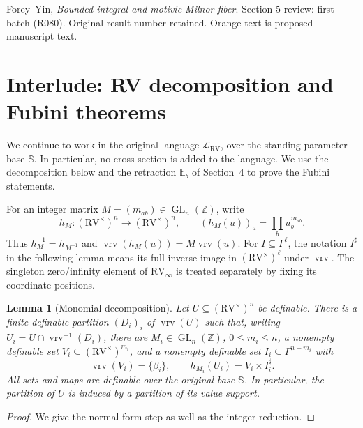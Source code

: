 \documentclass[12pt]{amsart}
\newtheorem{lem}{Lemma}[section]
\newcommand{\RV}{\mathrm{RV}}
\newcommand{\Z}{\mathds{Z}}
\newcommand{\vrv}{\operatorname{vrv}}
\newcommand{\GL}{\operatorname{GL}}
\newcommand{\Sbase}{\mathbb S}
\newcommand{\RVlang}{\mathcal L_{\mathrm{RV}}}
\numberwithin{equation}{section}
\begin{document}
\setcounter{section}{4}
{\small\noindent Forey--Yin, \emph{Bounded integral and motivic Milnor fiber}.
Section 5 review: first batch (R080). Original result number retained.
Orange text is proposed manuscript text.}
\medskip

{\color{ProposalOrange}
\section{Interlude: RV decomposition and Fubini theorems}\label{csndag}

We continue to work in the original language $\RVlang$, over the
standing parameter base $\Sbase$. In particular, no cross-section is
added to the language. We use the decomposition below and the
retraction $\mathbb E_b$ of Section~4 to prove the Fubini statements.

For an integer matrix $M=(m_{ab})\in\GL_n(\Z)$, write
\[
 h_M:(\RV^\times)^n\longrightarrow(\RV^\times)^n,\qquad
 (h_M(u))_a=\prod_b u_b^{m_{ab}}.
\]
Thus $h_M^{-1}=h_{M^{-1}}$ and
$\vrv(h_M(u))=M\vrv(u)$. For $I\subseteq\Gamma^\ell$, the notation
$I^\sharp$ in the following lemma means its full inverse image in
$(\RV^\times)^\ell$ under $\vrv$. The singleton zero/infinity element
of $\RV_\infty$ is treated separately by fixing its coordinate positions.

\setcounter{lem}{11}
\begin{lem}[Monomial decomposition]\label{coh:decom}
Let $U\subseteq(\RV^\times)^n$ be definable. There is a finite definable
partition $(D_i)_i$ of $\vrv(U)$ such that, writing
$U_i=U\cap\vrv^{-1}(D_i)$, there are $M_i\in\GL_n(\Z)$,
$0\leq m_i\leq n$, a nonempty definable set
$V_i\subseteq(\RV^\times)^{m_i}$, and a nonempty definable set
$I_i\subseteq\Gamma^{n-m_i}$ with
\[
 \vrv(V_i)=\{\beta_i\},\qquad
 h_{M_i}(U_i)=V_i\times I_i^\sharp .
\]
All sets and maps are definable over the original base $\Sbase$.
In particular, the partition of $U$ is induced by a partition of
its value support.
\end{lem}

\begin{proof}
We give the normal-form step as well as the integer reduction.


\end{proof}}
\end{document}
